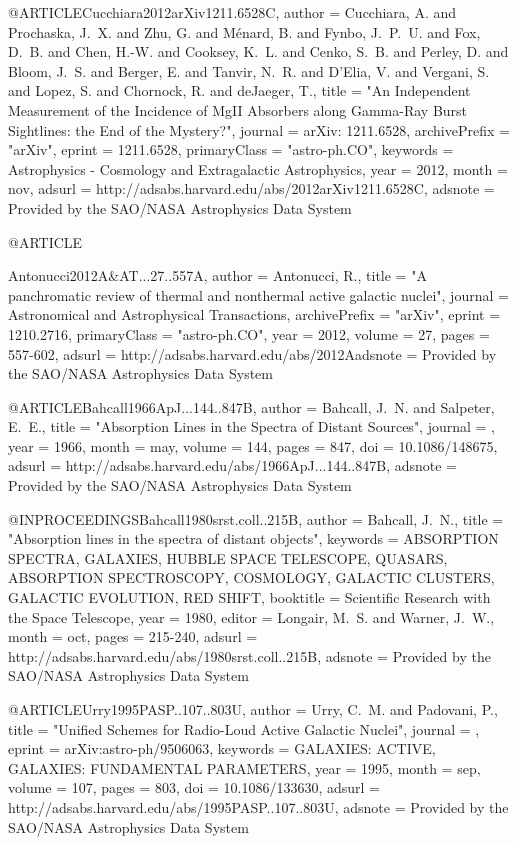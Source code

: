 \documentclass[twocolumn]{aastex62}
\begin{document}
{{{{{{{{{{{{{@ARTICLE{Cucchiara2012arXiv1211.6528C,
   author = {{Cucchiara}, A. and {Prochaska}, J.~X. and {Zhu}, G. and {M{\'e}nard}, B. and 
	{Fynbo}, J.~P.~U. and {Fox}, D.~B. and {Chen}, H.-W. and {Cooksey}, K.~L. and 
	{Cenko}, S.~B. and {Perley}, D. and {Bloom}, J.~S. and {Berger}, E. and 
	{Tanvir}, N.~R. and {D'Elia}, V. and {Vergani}, S. and {Lopez}, S. and 
	{Chornock}, R. and {deJaeger}, T.},
    title = "{An Independent Measurement of the Incidence of MgII Absorbers along Gamma-Ray Burst Sightlines: the End of the Mystery?}",
  journal = {arXiv: 1211.6528},
archivePrefix = "arXiv",
   eprint = {1211.6528},
 primaryClass = "astro-ph.CO",
 keywords = {Astrophysics - Cosmology and Extragalactic Astrophysics},
     year = 2012,
    month = nov,
   adsurl = {http://adsabs.harvard.edu/abs/2012arXiv1211.6528C},
  adsnote = {Provided by the SAO/NASA Astrophysics Data System}
}


@ARTICLE{Antonucci2012A&AT...27..557A,
   author = {{Antonucci}, R.},
    title = "{A panchromatic review of thermal and nonthermal active galactic nuclei}",
  journal = {Astronomical and Astrophysical Transactions},
archivePrefix = "arXiv",
   eprint = {1210.2716},
 primaryClass = "astro-ph.CO",
     year = 2012,
   volume = 27,
    pages = {557-602},
   adsurl = {http://adsabs.harvard.edu/abs/2012Aadsnote = {Provided by the SAO/NASA Astrophysics Data System}
}



@ARTICLE{Bahcall1966ApJ...144..847B,
   author = {{Bahcall}, J.~N. and {Salpeter}, E.~E.},
    title = "{Absorption Lines in the Spectra of Distant Sources}",
  journal = {\apj},
     year = 1966,
    month = may,
   volume = 144,
    pages = {847},
      doi = {10.1086/148675},
   adsurl = {http://adsabs.harvard.edu/abs/1966ApJ...144..847B},
  adsnote = {Provided by the SAO/NASA Astrophysics Data System}
}


@INPROCEEDINGS{Bahcall1980srst.coll..215B,
   author = {{Bahcall}, J.~N.},
    title = "{Absorption lines in the spectra of distant objects}",
 keywords = {ABSORPTION SPECTRA, GALAXIES, HUBBLE SPACE TELESCOPE, QUASARS, ABSORPTION SPECTROSCOPY, COSMOLOGY, GALACTIC CLUSTERS, GALACTIC EVOLUTION, RED SHIFT},
booktitle = {Scientific Research with the Space Telescope},
     year = 1980,
   editor = {{Longair}, M.~S. and {Warner}, J.~W.},
    month = oct,
    pages = {215-240},
   adsurl = {http://adsabs.harvard.edu/abs/1980srst.coll..215B},
  adsnote = {Provided by the SAO/NASA Astrophysics Data System}
}


@ARTICLE{Urry1995PASP..107..803U,
   author = {{Urry}, C.~M. and {Padovani}, P.},
    title = "{Unified Schemes for Radio-Loud Active Galactic Nuclei}",
  journal = {\pasp},
   eprint = {arXiv:astro-ph/9506063},
 keywords = {GALAXIES: ACTIVE, GALAXIES: FUNDAMENTAL PARAMETERS},
     year = 1995,
    month = sep,
   volume = 107,
    pages = {803},
      doi = {10.1086/133630},
   adsurl = {http://adsabs.harvard.edu/abs/1995PASP..107..803U},
  adsnote = {Provided by the SAO/NASA Astrophysics Data System}
}


}}}}}}}}}}}}}}
\end{document}
